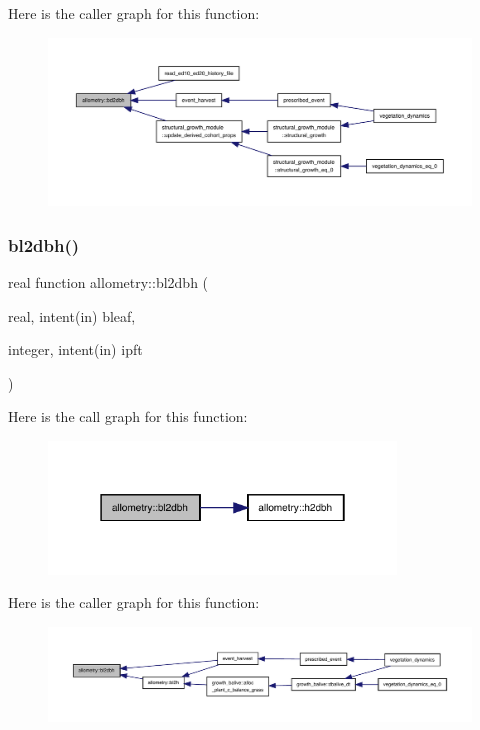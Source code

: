 Here is the caller graph for this function\+:
\nopagebreak
\begin{figure}[H]
\begin{center}
\leavevmode
\includegraphics[width=350pt]{namespaceallometry_a50fedbee3a14eb5569a62abb4a36198f_icgraph}
\end{center}
\end{figure}
\mbox{\label{namespaceallometry_a3236375dc165a26aeea2d97c7e2c2685}} 
\subsubsection{\texorpdfstring{bl2dbh()}{bl2dbh()}}
{\footnotesize\ttfamily real function allometry\+::bl2dbh (\begin{DoxyParamCaption}\item[{real, intent(in)}]{bleaf,  }\item[{integer, intent(in)}]{ipft }\end{DoxyParamCaption})}

Here is the call graph for this function\+:
\nopagebreak
\begin{figure}[H]
\begin{center}
\leavevmode
\includegraphics[width=262pt]{namespaceallometry_a3236375dc165a26aeea2d97c7e2c2685_cgraph}
\end{center}
\end{figure}
Here is the caller graph for this function\+:
\nopagebreak
\begin{figure}[H]
\begin{center}
\leavevmode
\includegraphics[width=350pt]{namespaceallometry_a3236375dc165a26aeea2d97c7e2c2685_icgraph}
\end{center}
\end{figure}
\mbox{\label{namespaceallometry_a59a1fc10140498dee62fce8a641da254}} 

